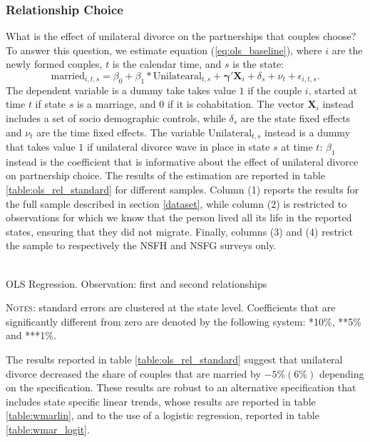 \documentclass[12pt]{article}
\numberwithin{table}{section}
\begin{document}
\subsubsection*{Relationship Choice}
What is the effect of unilateral divorce on the partnerships that couples choose? To answer this question, we estimate equation (\ref{eq:ols_baseline}), where $i$ are the newly formed couples, $t$ is the calendar time, and $s$ is the state: 
\begin{equation}\label{eq:ols_baseline}
\text{married}_{i,t,s}=\beta_0+\beta_1*\text{Unilatearal}_{t,s}+\mathbf{\gamma'}\mathbf{X}_i+\delta_s+\nu_t+\epsilon_{i,t,s}.
\end{equation}
The dependent variable is a dummy take takes value $1$ if the couple $i$, started at time $t$ if state $s$ is a marriage, and 0 if it is cohabitation. The vector $\mathbf{X}_i$ instead includes a set of socio demographic controls, while $\delta_s$ are the state fixed effects and  $\nu_t$ are the time fixed effects. The variable $\text{Unilateral}_{t,s}$ instead is a dummy that takes value $1$ if unilateral divorce wave in place in state $s$ at time $t$: $\beta_1$ instead is the coefficient that is informative about the effect of unilateral divorce on partnership choice. The results of the estimation are reported in table \ref{table:ols_rel_standard} for different samples. Column (1) reports the results for the full sample described in section \ref{dataset}, while column (2) is restricted to observations for which we know that the person lived all its life in the reported states, ensuring that they did not migrate. Finally, columns (3) and (4) restrict the sample to respectively the NSFH and NSFG surveys only.

	\begin{table}[H]\centering
		\caption{\\OLS Regression. Observation: first and second relationships}
		\label{table:ols_rel_standard}
		\begin{threeparttable}[t]\centering
			
	\begin{tablenotes}[flushleft]
		\footnotesize{\item \textsc{Notes}: standard errors are clustered at the state level.
			Coefficients that are significantly different from zero are denoted by the following system: *10\%, **5\%  and ***1\%.}
	\end{tablenotes}
\end{threeparttable}
\end{table}
\FloatBarrier
The results reported in table \ref{table:ols_rel_standard} suggest that unilateral divorce decreased the share of couples that are married by $-5\%(6\%)$ depending on the specification. These results are robust to an alternative specification that includes state specific linear trends, whose results are reported in table \ref{table:wmarlin}, and to the use of a logistic regression, reported in table \ref{table:wmar_logit}.
\end{document}
